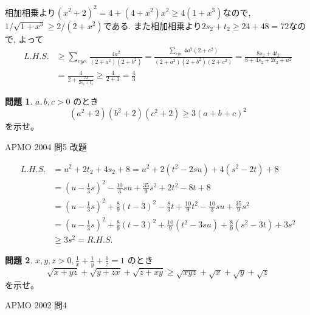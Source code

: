 \documentclass[uplatex, a5paper]{jsarticle}
\makeatletter
\theoremstyle{definition}
\newtheorem{prob}{問題}
\renewenvironment{proof}[1][\proofname]{
  \pushQED{\qed}%
  \normalfont \topsep6\p@\@plus6\p@\relax
  \trivlist
  \item[\hskip\labelsep
    #1\@addpunct{\textbf{.}}]\ignorespaces
}{%
  \popQED\endtrivlist\@endpefalse
}
\providecommand{\proofname}{証明}
\newcommand{\lhs }{ L.H.S. }
\newcommand{\rhs }{ R.H.S. }
\def\qed{\hfill $\Box$}
\makeatother
\begin{document}
\begin{proof}
  相加相乗より\((x^2+2)^2 = 4 + (4 + x^2)x^2 \geq 4(1+x^3)\)なので,
  \(1/\sqrt{1+x^3 } \geq 2/(2+x^2)\)である.
  また相加相乗より\(2s_2+t_2\geq 24+48 = 72\)なので, よって
  \begin{align*}
    \lhs &\geq \sum_{cyc.} \frac{4a^2}{(2+a^2)(2+b^2)}
    = \frac{\sum_{cyc.} 4a^2(2+c^2)}{(2+a^2)(2+b^2)(2+c^2)} = \frac{8s_2+ 4t_2}{8+ 4s_2+2t_2+u^2} \\
    &= \frac{4}{2+\frac{72}{2s_2+t_2}} \geq \frac{4}{2+1}=\frac{4}{3}
  \end{align*}
\end{proof}











\newpage

\begin{prob}
  \(a,b,c>0\)
  のとき
  \[
  (a^2+2)(b^2+2)(c^2+2) \geq 3(a+b+c)^2
  \]
  を示せ。
  \begin{flushright}
    APMO 2004 問5 改題
  \end{flushright}
\end{prob}


\begin{proof}
  \begin{align*}
    \lhs &= u^2 + 2t_2 + 4s_2 + 8 = u^2 + 2( t^2 -2su) + 4(s^2-2t) +8 \\
    &= \left( u - \frac{1}{3}s \right) ^2 - \frac{10}{3}su + \frac{35}{9}s^2 +2t^2 - 8t + 8 \\
    &= \left( u - \frac{1}{3}s \right) ^2 + \frac{8}{9}(t-3)^2 - \frac{8}{3}t
    + \frac{10}{9}t^2 - \frac{10}{3}su +
    \frac{35}{9}s^2 \\
    &= \left( u - \frac{1}{3}s \right) ^2 + \frac{8}{9}(t-3)^2 + \frac{10}{9}(t^2-3su) + \frac{8}{9}(s^2-3t) + 3s^2 \\
    &\geq 3s^2 = \rhs
  \end{align*}
\end{proof}










\newpage

\begin{prob}
  \(x,y,z>0, \displaystyle\frac{1}{x} + \frac{1}{y} + \frac{1}{z} = 1\)
  のとき
  \[
  \sqrt{x+yz} + \sqrt{y+zx} + \sqrt{z+xy} \geq \sqrt{xyz} + \sqrt{x} + \sqrt{y} + \sqrt{z}
  \]
  を示せ。
  \begin{flushright}
    APMO 2002 問4
  \end{flushright}
\end{prob}
\end{document}
